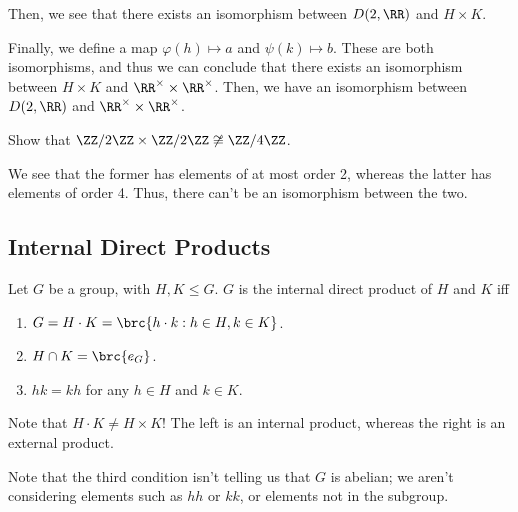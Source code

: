 \documentclass[openany]{book}
\begin{document}
\begin{solution}
	Then, we see that there exists an isomorphism between $D(2, \RR)$ and $H \times K$.

	Finally, we define a map $\varphi(h) \mapsto a$ and $\psi(k) \mapsto b$. These are both isomorphisms, and thus we can conclude that there exists an isomorphism between $H \times K$ and $\RR^{\times} \times \RR^{\times}$. Then, we have an isomorphism between $D(2, \RR)$ and $\RR^{\times} \times \RR^{\times}$.
\end{solution}

\begin{hw}
	Show that $\ZZ/2\ZZ \times \ZZ/2\ZZ \not\cong \ZZ/4\ZZ$.
\end{hw}
\begin{solution}
	We see that the former has elements of at most order 2, whereas the latter has elements of order 4. Thus, there can't be an isomorphism between the two.
\end{solution}

\subsection{Internal Direct Products}
\begin{defn}
	Let $G$ be a group, with $H, K \leq G$. $G$ is the internal direct product of $H$ and $K$ iff
	\begin{enumerate}
		\item $G = H \cdot K = \brc{h \cdot k : h \in H, k \in K}$.
		\item $H \cap K = \brc{e_G}$.
		\item $hk = kh$ for any $h \in H$ and $k \in K$.
	\end{enumerate}
\end{defn}

\begin{warn}
	Note that $H \cdot K \neq H \times K$! The left is an internal product, whereas the right is an external product.
\end{warn}

\begin{warn}
	Note that the third condition isn't telling us that $G$ is abelian; we aren't considering elements such as $hh$ or $kk$, or elements not in the subgroup.
\end{warn}
\end{document}
